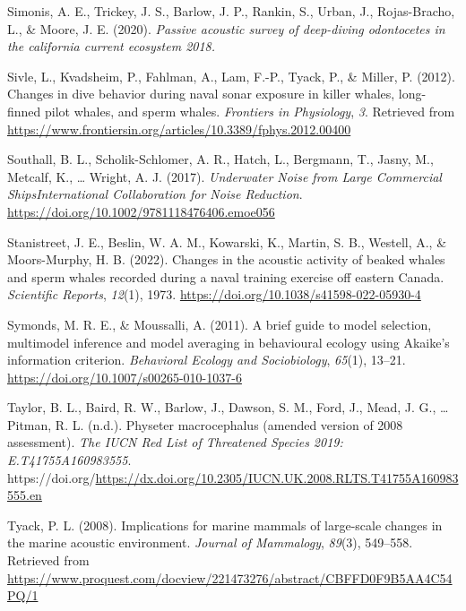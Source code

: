 \documentclass[
]{article}
\newlength{\cslhangindent}
\newlength{\cslentryspacingunit} %
\newenvironment{CSLReferences}[2] %
 {%
  \setlength{\parindent}{0pt}
  \ifodd #1
  \let\oldpar\par
  \def\par{\hangindent=\cslhangindent\oldpar}
  \fi
  \setlength{\parskip}{#2\cslentryspacingunit}
 }%
 {}
\begin{document}
\begin{CSLReferences}{1}{0}
\leavevmode{}%
Simonis, A. E., Trickey, J. S., Barlow, J. P., Rankin, S., Urban, J.,
Rojas-Bracho, L., \& Moore, J. E. (2020). \emph{Passive acoustic survey
of deep-diving odontocetes in the california current ecosystem 2018.}

\leavevmode{}%
Sivle, L., Kvadsheim, P., Fahlman, A., Lam, F.-P., Tyack, P., \& Miller,
P. (2012). Changes in dive behavior during naval sonar exposure in
killer whales, long-finned pilot whales, and sperm whales.
\emph{Frontiers in Physiology}, \emph{3}. Retrieved from
\url{https://www.frontiersin.org/articles/10.3389/fphys.2012.00400}

\leavevmode{}%
Southall, B. L., Scholik-Schlomer, A. R., Hatch, L., Bergmann, T.,
Jasny, M., Metcalf, K., \ldots{} Wright, A. J. (2017). \emph{Underwater
Noise from Large Commercial Ships{\textemdash}International
Collaboration for Noise Reduction}.
\url{https://doi.org/10.1002/9781118476406.emoe056}

\leavevmode{}%
Stanistreet, J. E., Beslin, W. A. M., Kowarski, K., Martin, S. B.,
Westell, A., \& Moors-Murphy, H. B. (2022). Changes in the acoustic
activity of beaked whales and sperm whales recorded during a naval
training exercise off eastern Canada. \emph{Scientific Reports},
\emph{12}(1), 1973. \url{https://doi.org/10.1038/s41598-022-05930-4}

\leavevmode{}%
Symonds, M. R. E., \& Moussalli, A. (2011). A brief guide to model
selection, multimodel inference and model averaging in behavioural
ecology using Akaike{'}s information criterion. \emph{Behavioral Ecology
and Sociobiology}, \emph{65}(1), 13--21.
\url{https://doi.org/10.1007/s00265-010-1037-6}

\leavevmode{}%
Taylor, B. L., Baird, R. W., Barlow, J., Dawson, S. M., Ford, J., Mead,
J. G., \ldots{} Pitman, R. L. (n.d.). Physeter macrocephalus (amended
version of 2008 assessment). \emph{The IUCN Red List of Threatened
Species 2019: E.T41755A160983555}.
https://doi.org/\url{https://dx.doi.org/10.2305/IUCN.UK.2008.RLTS.T41755A160983555.en}

\leavevmode{}%
Tyack, P. L. (2008). Implications for marine mammals of large-scale
changes in the marine acoustic environment. \emph{Journal of Mammalogy},
\emph{89}(3), 549--558. Retrieved from
\url{https://www.proquest.com/docview/221473276/abstract/CBFFD0F9B5AA4C54PQ/1}


\end{CSLReferences}
\end{document}
